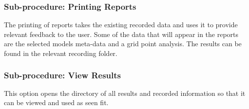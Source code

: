 \subsubsection{Sub-procedure: Printing Reports}
The printing of reports takes the existing recorded data and uses it to provide relevant feedback to the user. Some of the data that will appear in the reports are the selected models meta-data and a grid point analysis. The results can be found in the relevant recording folder.

\subsubsection{Sub-procedure: View Results}
This option opens the directory of all results and recorded information so that it can be viewed and used as seen fit.